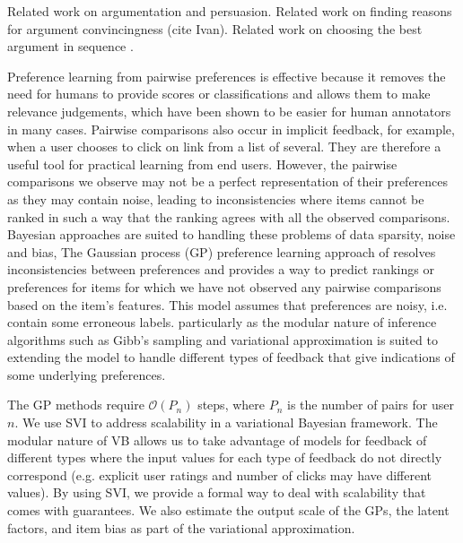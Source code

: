 Related work on argumentation and persuasion. Related work on finding reasons for argument convincingness (cite Ivan). Related work on choosing the best argument in sequence \cite{rosenfeld2016providing}\cite{monteserin2013reinforcement}. 

Preference learning from pairwise preferences is effective because it removes the need for humans to provide scores or classifications and allows them to make relevance judgements,
which have been shown to be easier for human annotators in many cases\cite{brochu_active_2007}. Pairwise comparisons also occur in implicit feedback, for example, when a user chooses to click on link from a list of several. They are therefore a useful tool for practical learning from end users. 
However, the pairwise comparisons we observe may not be a perfect representation of their preferences as they may contain noise, leading to inconsistencies where items cannot be ranked in such a way that the ranking agrees with all the observed comparisons. 
Bayesian approaches are suited to handling these problems of data sparsity, noise and bias, 
The Gaussian process (GP) preference learning approach of \cite{chu2005preference} resolves inconsistencies between preferences and provides a way to predict rankings or preferences for 
items for which we have not observed any pairwise comparisons based on the item's features. 
This model assumes that preferences are noisy, i.e. contain some erroneous labels.
particularly as the modular nature of inference algorithms such as Gibb's sampling and variational approximation is suited to extending the model to handle different types of feedback that give indications of some underlying preferences. 

The GP methods require $\mathcal{O}(P_n)$ steps, where $P_n$ is the number of pairs for 
user $n$. 
We use SVI to address scalability in a variational Bayesian framework. 
The modular nature of VB allows us to take advantage of models for feedback of different types
where the input values for each type of feedback do not directly correspond (e.g. explicit user ratings and number of clicks may have different values).
By using SVI, we provide a formal way to deal with scalability that comes with guarantees\cite{hoffman2013stochastic}.
We also estimate the output scale of the GPs, the latent factors, and item bias as part of the 
variational approximation. %


